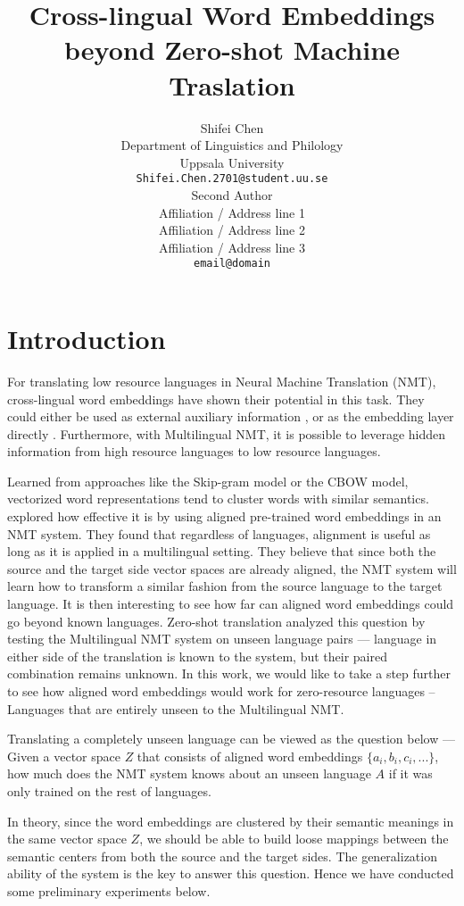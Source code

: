 \documentclass[11pt,a4paper]{article}
\title{Cross-lingual Word Embeddings beyond Zero-shot Machine Traslation}
\author{Shifei Chen \\
 Department of Linguistics and Philology \\
 Uppsala University \\
 \texttt{Shifei.Chen.2701@student.uu.se} \\\And
 Second Author \\
 Affiliation / Address line 1 \\
 Affiliation / Address line 2 \\
 Affiliation / Address line 3 \\
 \texttt{email@domain} \\}
\date{}
\begin{document}
\maketitle

\section{Introduction}
For translating low resource languages in Neural Machine Translation (NMT), cross-lingual word embeddings have shown their potential in this task. They could either be used as external auxiliary information \cite{Conneau:2017aa, Lakew:2019aa}, or as the embedding layer directly \cite{neishi-etal-2017-bag,artetxe-etal-2017-learning}. Furthermore, with Multilingual NMT, it is possible to leverage hidden information from high resource languages to low resource languages.

Learned from approaches like the Skip-gram model or the CBOW model, vectorized word representations tend to cluster words with similar semantics. \citet{Qi:2018aa} explored how effective it is by using aligned pre-trained word embeddings in an NMT system. They found that regardless of languages, alignment is useful as long as it is applied in a multilingual setting. They believe that since both the source and the target side vector spaces are already aligned, the NMT system will learn how to transform a similar fashion from the source language to the target language. It is then interesting to see how far can aligned word embeddings could go beyond known languages. Zero-shot translation analyzed this question by testing the Multilingual NMT system on unseen language pairs --- language in either side of the translation is known to the system, but their paired combination remains unknown. In this work, we would like to take a step further to see how aligned word embeddings would work for zero-resource languages -- Languages that are entirely unseen to the Multilingual NMT.

Translating a completely unseen language can be viewed as the question below --- Given a vector space $Z$ that consists of aligned word embeddings $\{a_i, b_i, c_i, ...\}$, how much does the NMT system knows about an unseen language $A$ if it was only trained on the rest of languages.

In theory, since the word embeddings are clustered by their semantic meanings in the same vector space $Z$, we should be able to build loose mappings between the semantic centers from both the source and the target sides. The generalization ability of the system is the key to answer this question. Hence we have conducted some preliminary experiments below.
\end{document}
